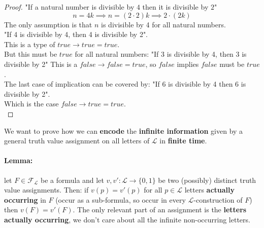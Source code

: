 \documentclass[11pt]{article}
\begin{document}
\begin{proof}
		\newpage
		
		"If a natural number is divisible by $4$ then it is divisible by $2$"
		$$ n = 4k \implies n = (2 \cdot 2) k \implies 2 \cdot (2k) $$
		The only assumption is that $n$ is divisible by 4 for all natural numbers.\\
		
		"If 4 is divisible by 4, then 4 is divisible by 2".\\
		This is a type of $true \rightarrow true = true$.\\
		
		But this must be $true$ for all natural numbers: "If 3 is divisible by 4, then 3 is divisible by 2"
		This is a $false \rightarrow false = true$, so $false$ implies $false$ must be $true$.\\
		
		The last case of implication can be covered by: "If 6 is divisible by 4 then 6 is divisible by 2". \\
		Which is the case $false \rightarrow true = true$.\\
	\end{proof}
	
	We want to prove how we can \textbf{encode} the \textbf{infinite information} given by a general truth value assignment on all letters of $\mathcal{L}$ in \textbf{finite time}.\\
	
	\paragraph{Lemma:} let $F \in \mathcal{F}_\mathcal{L}$ be a formula and let $v,v' : \mathcal{L} \rightarrow \{0,1\}$ be two (possibly) distinct truth value assignments.  Then: if $v(p) = v'(p)$ for all $p \in \mathcal{L}$ letters \textbf{actually occurring} in $F$ (occur as a sub-formula, so occur in every $\mathcal{L}$-construction of $F$) then $v(F) = v'(F)$. The only relevant part of an assignment is the \textbf{letters actually occurring}, we don't care about all the infinite non-occurring letters. \\
	
\end{document}
